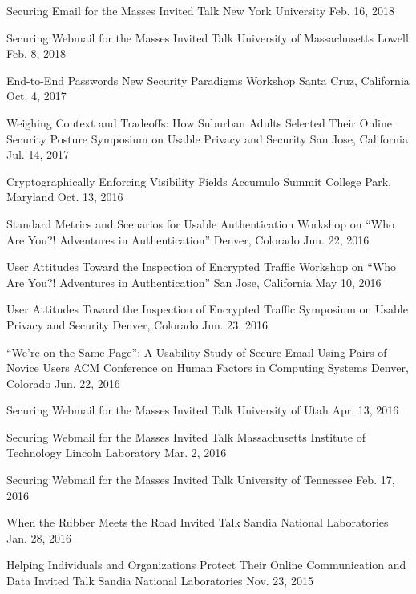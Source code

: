 \begin{presentations}
	\presentation
		{Securing Email for the Masses}
		{Invited Talk}
		{New York University}
		{Feb. 16, 2018}
	
	\presentation
		{Securing Webmail for the Masses}
		{Invited Talk}
		{University of Massachusetts Lowell}
		{Feb. 8, 2018}
	
	\presentation
		{End-to-End Passwords}
		{ New Security Paradigms Workshop}
		{Santa Cruz, California}
		{Oct. 4, 2017}
		
	\presentation
		{Weighing Context and Tradeoffs: How Suburban Adults Selected Their Online Security Posture}
		{ Symposium on Usable Privacy and Security}
		{San Jose, California}
		{Jul.  14, 2017}

	\presentation
		{Cryptographically Enforcing Visibility Fields}
		{Accumulo Summit}
		{College Park, Maryland}
		{Oct. 13, 2016}
		
	\presentation
		{Standard Metrics and Scenarios for Usable Authentication}
		{ Workshop on ``Who Are You?! Adventures in Authentication''}
		{Denver, Colorado}
		{Jun.  22, 2016}
		
	\presentation
		{User Attitudes Toward the Inspection of Encrypted Traffic}
		{ Workshop on ``Who Are You?! Adventures in Authentication''}
		{San Jose, California}
		{May  10, 2016}
		
	\presentation
		{User Attitudes Toward the Inspection of Encrypted Traffic}
		{ Symposium on Usable Privacy and Security}
		{Denver, Colorado}
		{Jun.  23, 2016}
	
	\presentation
		{``We're on the Same Page'': A Usability Study of Secure Email Using Pairs of Novice Users}
		{ ACM Conference on Human Factors in Computing Systems}
		{Denver, Colorado}
		{Jun.  22, 2016}
		
	\presentation
		{Securing Webmail for the Masses}
		{Invited Talk}
		{University of Utah}
		{Apr. 13, 2016}
		
	\presentation
		{Securing Webmail for the Masses}
		{Invited Talk}
		{Massachusetts Institute of Technology Lincoln Laboratory}
		{Mar. 2, 2016}
		
	\presentation
		{Securing Webmail for the Masses}
		{Invited Talk}
		{University of Tennessee}
		{Feb. 17, 2016}
		
	\presentation
		{When the Rubber Meets the Road}
		{Invited Talk}
		{Sandia National Laboratories}
		{Jan. 28, 2016}
	
	\presentation
		{Helping Individuals and Organizations Protect Their Online Communication and Data}
		{Invited Talk}
		{Sandia National Laboratories}
		{Nov. 23, 2015}
		

\end{presentations}

